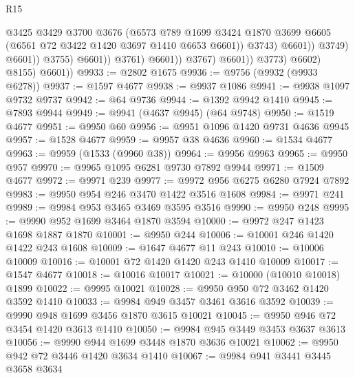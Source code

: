 \begin{lexlean}{R15}
\begin{coremodule}
                                            @3425
                                            @3429
                                            @3700
                                            @3676
                                            (@6573
                                              @789
                                              @1699
                                              @3424
                                              @1870
                                              @3699
                                              @6605
                                              (@6561 @72 @3422 @1420 @3697 @1410 @6653 @6601))
                                            @3743)
                                          @6601))
                                      @3749)
                                    @6601))
                                @3755)
                              @6601))
                          @3761)
                        @6601))
                    @3767)
                  @6601))
              @3773)
            @6602)
          @8155)
        @6601))
@9933 := @2802 @1675
@9936 := @9756 (@9932 (@9933 @6278))
@9937 := @1597 @4677
@9938 := @9937 @1086
@9941 := @9938 @1097 @9732 @9737
@9942 := @64 @9736
@9944 := @1392 @9942 @1410
@9945 := @7893 @9944
@9949 := @9941 (@4637 @9945) (@64 @9748)
@9950 := @1519 @4677
@9951 := @9950 @60
@9956 := @9951 @1096 @1420 @9731 @4636 @9945
@9957 := @1528 @4677
@9959 := @9957 @38 @4636
@9960 := @1534 @4677
@9963 := @9959 (@1533 (@9960 @38))
@9964 := @9956 @9963
@9965 := @9950 @957
@9970 := @9965 @1095 @6281 @9730 @7892 @9944
@9971 := @1509 @4677
@9972 := @9971 @239
@9977 := @9972 @956 @6275 @6280 @7924 @7892
@9983 := @9950 @954 @246 @3470 @1422 @3516 @1608
@9984 := @9971 @241
@9989 := @9984 @953 @3465 @3469 @3595 @3516
@9990 := @9950 @248
@9995 := @9990 @952 @1699 @3464 @1870 @3594
@10000 := @9972 @247 @1423 @1698 @1887 @1870
@10001 := @9950 @244
@10006 := @10001 @246 @1420 @1422 @243 @1608
@10009 := @1647 @4677 @11 @243
@10010 := @10006 @10009
@10016 := @10001 @72 @1420 @1420 @243 @1410 @10009
@10017 := @1547 @4677
@10018 := @10016 @10017
@10021 := @10000 (@10010 @10018) @1899
@10022 := @9995 @10021
@10028 := @9950 @950 @72 @3462 @1420 @3592 @1410
@10033 := @9984 @949 @3457 @3461 @3616 @3592
@10039 := @9990 @948 @1699 @3456 @1870 @3615 @10021
@10045 := @9950 @946 @72 @3454 @1420 @3613 @1410
@10050 := @9984 @945 @3449 @3453 @3637 @3613
@10056 := @9990 @944 @1699 @3448 @1870 @3636 @10021
@10062 := @9950 @942 @72 @3446 @1420 @3634 @1410
@10067 := @9984 @941 @3441 @3445 @3658 @3634

\end{coremodule}
\end{lexlean}
